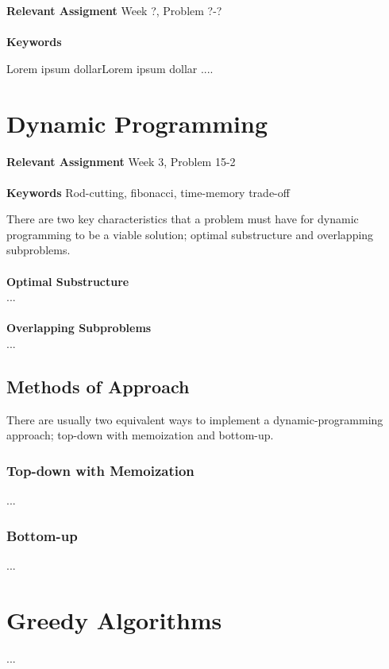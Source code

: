 \documentclass[11pt,english]{book}
\begin{document}
\textbf{Relevant Assigment} Week ?, Problem ?-?\\\\
\textbf{Keywords} 
\vspace{1in}

\noindent Lorem ipsum dollarLorem ipsum dollar ....


\chapter{Dynamic Programming}
\label{ch:dynamicprog}

\textbf{Relevant Assignment} Week 3, Problem 15-2\\\\
\textbf{Keywords} Rod-cutting, fibonacci, time-memory trade-off
\vspace{1in}

\noindent There are two key characteristics that a problem must have for
dynamic programming to be a viable solution; optimal substructure and
overlapping subproblems.
\\\\
\noindent \textbf{Optimal Substructure}\\
... %
\\\\
\noindent \textbf{Overlapping Subproblems}\\
... %

\newpage
\section{Methods of Approach}
There are usually two equivalent ways to implement a dynamic-programming
approach; top-down with memoization and bottom-up.

\subsection{Top-down with Memoization}
...

\subsection{Bottom-up}
...



\chapter{Greedy Algorithms}
\label{ch:greedyalg}
...
\end{document}
